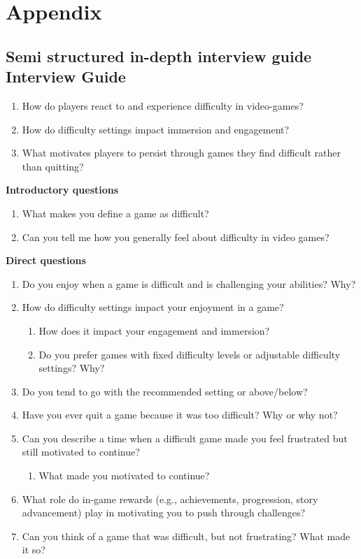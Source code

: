 
\section{Appendix}

\subsection{Semi structured in-depth interview guide Interview Guide}\label{Interview guide}

\begin{enumerate}
    \item How do players react to and experience difficulty in video-games? 
    \item How do difficulty settings impact immersion and engagement? 
    \item What motivates players to persist through games they find difficult rather than quitting?
\end{enumerate}

\textbf{Introductory questions}
\begin{enumerate}
    \item What makes you define a game as difficult?
    \item Can you tell me how you generally feel about difficulty in video games?
\end{enumerate}

\textbf{Direct questions}
\begin{enumerate}
    \item Do you enjoy when a game is difficult and is challenging your abilities? Why?
    \item How do difficulty settings impact your enjoyment in a game?
    \begin{enumerate}
        \item How does it impact your engagement and immersion?
        \item Do you prefer games with fixed difficulty levels or adjustable difficulty settings? Why?
    \end{enumerate}
    \item Do you tend to go with the recommended setting or above/below?
    \item Have you ever quit a game because it was too difficult? Why or why not?
    \item Can you describe a time when a difficult game made you feel frustrated but still motivated to continue?
    \begin{enumerate}
        \item What made you motivated to continue?
    \end{enumerate}
    \item What role do in-game rewards (e.g., achievements, progression, story advancement) play in motivating you to push through challenges?
    \item Can you think of a game that was difficult, but not frustrating? What made it so?
\end{enumerate}


